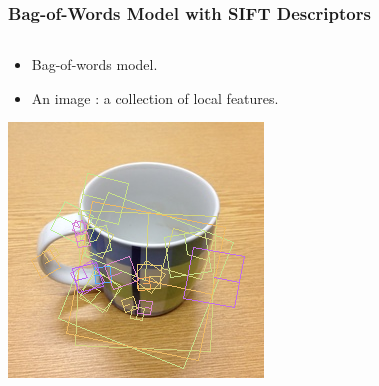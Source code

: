 \documentclass[t]{beamer}
\begin{document}
\begin{frame}
  \frametitle{Bag-of-Words Model with SIFT Descriptors}

  \begin{columns}
    \begin{column}{.46\linewidth}
      \begin{itemize}
        \item Bag-of-words model. 
        \item An image : a collection of local features.
      \end{itemize}
      \centering
      \includegraphics[width=.5\columnwidth]{mug2k}
    \end{column}


\end{columns}
\end{frame}
\end{document}
